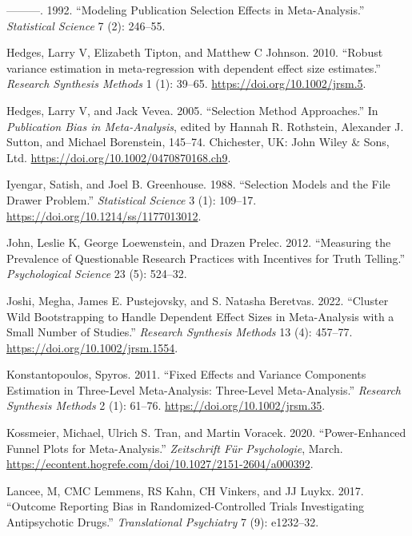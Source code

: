 \documentclass[
]{article}
\newlength{\cslhangindent}
\newenvironment{CSLReferences}[2] %
 {\begin{list}{}{%
  \setlength{\itemindent}{0pt}
  \setlength{\leftmargin}{0pt}
  \setlength{\parsep}{0pt}
  \ifodd #1
   \setlength{\leftmargin}{\cslhangindent}
   \setlength{\itemindent}{-1\cslhangindent}
  \fi
  \setlength{\itemsep}{#2\baselineskip}}}
 {\end{list}}
\begin{document}
\begin{CSLReferences}{1}{0}
---------. 1992. {``Modeling Publication Selection Effects in
Meta-Analysis.''} \emph{Statistical Science} 7 (2): 246--55.

Hedges, Larry V, Elizabeth Tipton, and Matthew C Johnson. 2010.
{``{Robust variance estimation in meta-regression with dependent effect
size estimates}.''} \emph{Research Synthesis Methods} 1 (1): 39--65.
\url{https://doi.org/10.1002/jrsm.5}.

Hedges, Larry V, and Jack Vevea. 2005. {``Selection Method
Approaches.''} In \emph{Publication Bias in Meta-Analysis}, edited by
Hannah R. Rothstein, Alexander J. Sutton, and Michael Borenstein,
145--74. {Chichester, UK}: {John Wiley \& Sons, Ltd}.
\url{https://doi.org/10.1002/0470870168.ch9}.

Iyengar, Satish, and Joel B. Greenhouse. 1988. {``Selection {Models} and
the {File} {Drawer} {Problem}.''} \emph{Statistical Science} 3 (1):
109--17. \url{https://doi.org/10.1214/ss/1177013012}.

John, Leslie K, George Loewenstein, and Drazen Prelec. 2012.
{``Measuring the Prevalence of Questionable Research Practices with
Incentives for Truth Telling.''} \emph{Psychological Science} 23 (5):
524--32.

Joshi, Megha, James E. Pustejovsky, and S. Natasha Beretvas. 2022.
{``Cluster Wild Bootstrapping to Handle Dependent Effect Sizes in
Meta-Analysis with a Small Number of Studies.''} \emph{Research
Synthesis Methods} 13 (4): 457--77.
\url{https://doi.org/10.1002/jrsm.1554}.

Konstantopoulos, Spyros. 2011. {``Fixed Effects and Variance Components
Estimation in Three-Level Meta-Analysis: {Three}-Level Meta-Analysis.''}
\emph{Research Synthesis Methods} 2 (1): 61--76.
\url{https://doi.org/10.1002/jrsm.35}.

Kossmeier, Michael, Ulrich S. Tran, and Martin Voracek. 2020.
{``Power-Enhanced Funnel Plots for Meta-Analysis.''} \emph{Zeitschrift
Für Psychologie}, March.
\url{https://econtent.hogrefe.com/doi/10.1027/2151-2604/a000392}.

Lancee, M, CMC Lemmens, RS Kahn, CH Vinkers, and JJ Luykx. 2017.
{``Outcome Reporting Bias in Randomized-Controlled Trials Investigating
Antipsychotic Drugs.''} \emph{Translational Psychiatry} 7 (9):
e1232--32.


\end{CSLReferences}
\end{document}
